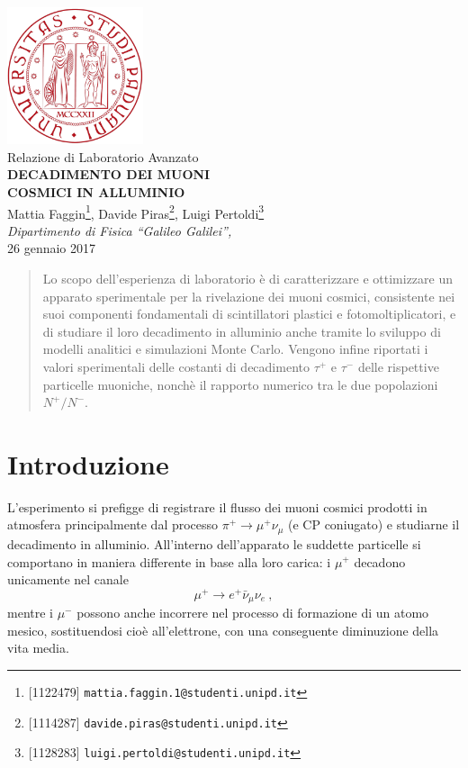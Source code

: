 \documentclass[10pt, oneside, a4paper]{article}   	%
\begin{document}
\begin{titlepage}
\thispagestyle{empty}
  \begin{center}
    \includegraphics[width=4cm]{img/logo.pdf} \\
    \vspace{1cm}
    \Large{Relazione di Laboratorio Avanzato} \\
    \vspace{0.2cm}
    \LARGE{\textbf{DECADIMENTO DEI MUONI\\ COSMICI IN ALLUMINIO}} \\
    \vspace{0.7cm}
    \large
    Mattia Faggin\footnote{[1122479] \texttt{mattia.faggin.1@studenti.unipd.it}},
    Davide Piras\footnote{[1114287] \texttt{davide.piras@studenti.unipd.it}},
    Luigi Pertoldi\footnote{[1128283] \texttt{luigi.pertoldi@studenti.unipd.it}} \\
    \vspace{1.8cm}
    \textsl{Dipartimento di Fisica ``Galileo Galilei'',} \\
    26 gennaio 2017
%
    \vspace{1cm}
    \begin{abstract}
      \normalsize
      \noindent Lo scopo dell'esperienza di laboratorio è di caratterizzare e ottimizzare un apparato sperimentale per la rivelazione dei muoni cosmici, consistente nei suoi componenti fondamentali di scintillatori plastici e fotomoltiplicatori, e di studiare il loro decadimento in alluminio anche tramite lo sviluppo di modelli analitici e simulazioni Monte Carlo. Vengono infine riportati i valori sperimentali delle costanti di decadimento $\tau^+$ e $\tau^-$ delle rispettive particelle muoniche, nonchè il rapporto numerico tra le due popolazioni $N^+/N^-$.
    \end{abstract}
  \end{center}
\end{titlepage}
\cleardoublepage
%
\tableofcontents
\clearpage
\listoffigures
\listoftables
%
\clearpage
\section{Introduzione}
L'esperimento si prefigge di registrare il flusso dei muoni cosmici prodotti in atmosfera principalmente dal processo $\pi^+\to\mu^+\nu_\mu$ (e CP coniugato) e studiarne il decadimento in alluminio. All'interno dell'apparato le suddette particelle si comportano in maniera differente in base alla loro carica: i $\mu^+$ decadono unicamente nel canale
\[\mu^+\to e^+\bar{\nu}_\mu\nu_e\ ,\]
mentre i $\mu^-$ possono anche incorrere nel processo di formazione di un atomo mesico, sostituendosi cioè all'elettrone, con una conseguente diminuzione della vita media.
\end{document}
